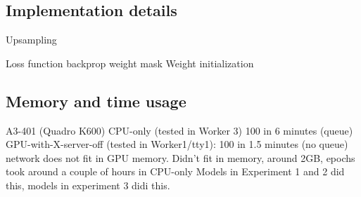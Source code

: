 
\subsection{Implementation details}
Upsampling

Loss function backprop weight mask
Weight initialization

\subsection{Memory and time usage}
A3-401 (Quadro K600)
CPU-only (tested in Worker 3) 100 in 6 minutes (queue)
GPU-with-X-server-off (tested in Worker1/tty1): 100 in 1.5 minutes (no queue)
network does not fit in GPU memory.
Didn't fit in memory, around 2GB, epochs took around a couple of hours in CPU-only
Models in Experiment 1 and 2 did this, models in experiment 3 didi this.
